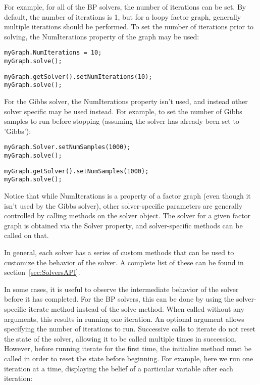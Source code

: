 For example, for all of the BP solvers, the number of iterations can be set.  By default, the number of iterations is 1, but for a loopy factor graph, generally multiple iterations should be performed.  To set the number of iterations prior to solving, the NumIterations property of the graph may be used:

\ifmatlab

\begin{lstlisting}
myGraph.NumIterations = 10;
myGraph.solve();
\end{lstlisting}

\fi

\ifjava

\begin{lstlisting}
myGraph.getSolver().setNumIterations(10);
myGraph.solve();
\end{lstlisting}


\fi

For the Gibbs solver, the NumIterations property isn't used, and instead other solver specific may be used instead.  For example, to set the number of Gibbs samples to run before stopping (assuming the solver has already been set to 'Gibbs'):

\ifmatlab
\begin{lstlisting}
myGraph.Solver.setNumSamples(1000);
myGraph.solve();
\end{lstlisting}
\fi

\ifjava
\begin{lstlisting}
myGraph.getSolver().setNumSamples(1000);
myGraph.solve();
\end{lstlisting}
\fi

Notice that while NumIterations is a property of a factor graph (even though it isn't used by the Gibbs solver), other solver-specific parameters are generally controlled by calling methods on the solver object.  The solver for a given factor graph is obtained via the Solver property, and solver-specific methods can be called on that.

In general, each solver has a series of custom methods that can be used to customize the behavior of the solver.  A complete list of these can be found in section~\ref{sec:SolversAPI}.

In some cases, it is useful to observe the intermediate behavior of the solver before it has completed.  For the BP solvers, this can be done by using the solver-specific iterate method instead of the solve method.  When called without any arguments, this results in running one iteration.  An optional argument allows specifying the number of iterations to run.  Successive calls to iterate do not reset the state of the solver, allowing it to be called multiple times in succession.  However, before running iterate for the first time, the initialize method must be called in order to reset the state before beginning.  For example, here we run one iteration at a time, displaying the belief of a particular variable after each iteration:


